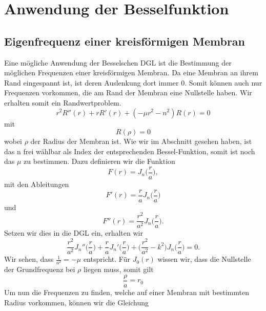 \section{Anwendung der Besselfunktion}
\subsection[Eigenfrequenz einer kreisförmigen Membram]{Eigenfrequenz einer kreisförmigen Membran}

Eine mögliche Anwendung der Besselschen DGL ist die Bestimmung der möglichen Frequenzen einer kreisförmigen Membran. 
Da eine Membran an ihrem Rand eingespannt ist, ist deren Auslenkung dort immer 0. Somit können auch nur Frequenzen vorkommen, die am Rand der Membran eine Nullstelle haben. Wir erhalten somit ein Randwertproblem.
\begin{equation}
r^2 R''(r) + r R'(r) + (-\mu r^2 - n^2)R(r) = 0
\label{eq:dglmitmu}
\end{equation}
mit 
\begin{equation}
R(\rho) = 0
\end{equation}
wobei $\rho$ der Radius der Membran ist.
Wie wir im Abschnitt  gesehen haben, ist das n frei wählbar als Index der entsprechenden Bessel-Funktion, somit ist noch das $\mu$ zu bestimmen. 
Dazu definieren wir die Funktion
\begin{equation}
F(r) = J_n \biggl(\frac{r}{a} \biggr),
\end{equation}
mit den Ableitungen
\begin{equation}
F'(r) = \frac{r}{a} J_n \biggl(\frac{r}{a} \biggr)
\end{equation}
und 
\begin{equation}
F''(r) = \frac{r^2}{a^2} J_n \biggl(\frac{r}{a} \biggr).
\end{equation}
Setzen wir dies in die DGL  ein, erhalten wir
\begin{equation}
\frac{r^2}{a^2}J_n''\biggl(\frac{r}{a} \biggr) +
\frac{r}{a}J_n'\biggl(\frac{r}{a} \biggr) +
\biggl(\frac{r^2}{a^2} - k^2\biggr)J_n\biggl(\frac{r}{a}\biggr) = 0.
\end{equation}
Wir sehen, dass $\frac{1}{a^2}=-\mu$ entspricht.
Für $J_0(r)$ wissen wir, dass die Nullstelle der Grundfrequenz bei $\rho$ liegen muss, somit gilt
\begin{equation}
\frac{\rho}{a} = r_0
\end{equation}
Um nun die Frequenzen zu finden, welche auf einer Membran mit bestimmten Radius vorkommen, können wir die Gleichung
